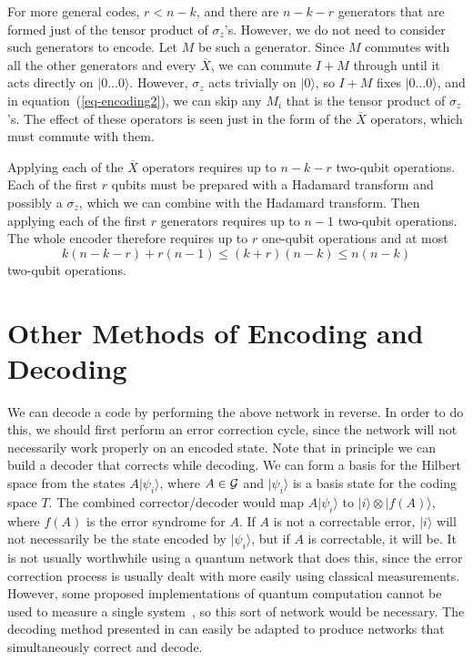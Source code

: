 \documentclass{report}
\newcommand{\G}{{\cal G}}
\newcommand{\ket}[1]{|{#1}\rangle}
\newcommand{\Z}{\sigma_z}
\newcommand{\Xbar}{\overline{X}}
\begin{document}
For more general codes, $r<n-k$, and there are $n-k-r$ generators that are 
formed just of the tensor product of $\Z$'s.  However, we do not need to 
consider such generators to encode.  Let $M$ be such a generator.  Since 
$M$ commutes with all the other generators and every $\Xbar$, we can 
commute $I + M$ through until it acts directly on $\ket{0 \ldots 0}$.  
However, $\Z$ acts trivially on $\ket{0}$, so $I+M$ fixes $\ket{0 \ldots 0}$, 
and in equation~(\ref{eq-encoding2}), we can skip any $M_i$ that is the tensor 
product of $\Z$'s.  The effect of these operators is seen just in 
the form of the $\Xbar$ operators, which must commute with them.

Applying each of the $\Xbar$ operators requires up to $n-k-r$ two-qubit 
operations.  Each of the first $r$ qubits must be prepared with a Hadamard 
transform and possibly a $\Z$, which we can combine with the Hadamard 
transform.  Then applying each of the first $r$ generators requires up to 
$n-1$ two-qubit operations.  The whole encoder therefore requires up to $r$ 
one-qubit operations and at most
\begin{equation}
k(n-k-r) + r(n-1) \leq (k+r)(n-k) \leq n(n-k)
\end{equation} 
two-qubit operations.

\section{Other Methods of Encoding and Decoding}

We can decode a code by performing the above network in reverse.  In 
order to do this, we should first perform an error correction cycle, since 
the network will not necessarily work properly on an encoded state.  Note 
that in principle we can build a decoder that corrects while decoding.  We 
can form a basis for the Hilbert space from the states $A \ket{\psi_i}$, 
where $A \in \G$ and $\ket{\psi_i}$ is a basis state for the coding space 
$T$.  The combined corrector/decoder would map $A \ket{\psi_i}$ to 
$\ket{i} \otimes \ket{f(A)}$, where $f(A)$ is the error syndrome for $A$.  
If $A$ is not a correctable error, $\ket{i}$ will not necessarily be the state 
encoded by $\ket{\psi_i}$, but if $A$ is correctable, it will be.  It is not 
usually worthwhile using a quantum network that does this, since the error 
correction process is usually dealt with more easily using classical 
measurements.  However, some proposed implementations of quantum computation 
cannot be used to measure a single system~\cite{gershenfeld}, so this sort of 
network would be necessary.  The decoding method presented in 
\cite{divincenzo-decoder} can easily be adapted to produce networks that
simultaneously correct and decode.
\end{document}

